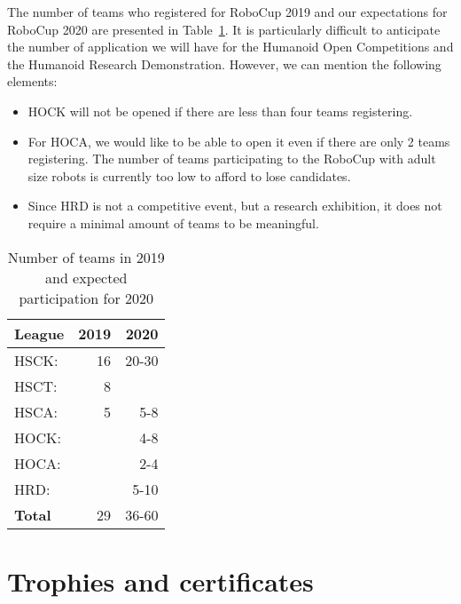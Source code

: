 \documentclass{article}
\begin{document}
The number of teams who registered for RoboCup 2019 and our expectations for
RoboCup 2020 are presented in Table~\ref{tab:nb_teams}.
It is particularly difficult to anticipate the number of application we will
have for the Humanoid Open Competitions and the Humanoid Research Demonstration.
However, we can mention the following elements:
\begin{itemize}
\item HOCK will not be opened if there are less than four teams registering.
\item For HOCA, we would like to be able to open it even if there are only 2
  teams registering.
  The number of teams participating to the RoboCup with adult size robots is
  currently too low to afford to lose candidates.
\item Since HRD is not a competitive event, but a research exhibition,
  it does not require a minimal amount of teams to be meaningful.
\end{itemize}

\begin{table}[h]
  \centering
  \caption{\label{tab:nb_teams}Number of teams in 2019 and expected
    participation for 2020}
  \begin{tabular}{l | r | r}
    League & 2019 & 2020\\
    \hline
    HSCK: & 16 & 20-30\\ 
    HSCT: & 8 & \\ 
    HSCA: & 5 & 5-8\\ 
    HOCK: &  & 4-8\\
    HOCA: &  & 2-4\\ 
    HRD: &  & 5-10\\
    \hline
    \textbf{Total} & 29 & 36-60
  \end{tabular}
\end{table}


\section{Trophies and certificates}
\end{document}
